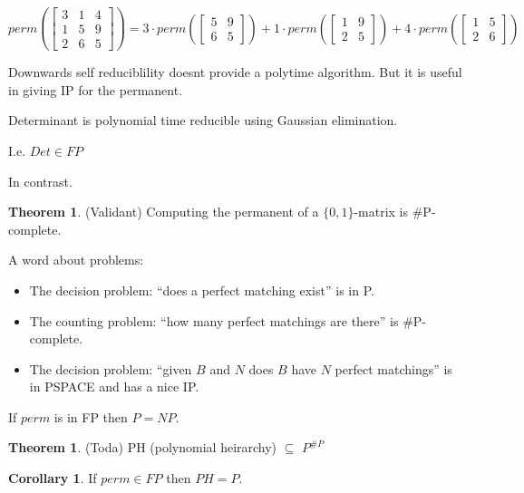 \documentclass[a4paper,12pt]{article}
\theoremstyle{definition}
\newtheorem{theorem}[counter]{Theorem}
\newtheorem{corollary}[counter]{Corollary}
\theoremstyle{remark}
\begin{document}
\begin{equation*}
    perm(\begin{bmatrix}
        3 & 1 & 4 \\
        1 & 5 & 9 \\
        2 & 6 & 5
    \end{bmatrix})
    =
    3 \cdot perm(\begin{bmatrix}
        5 & 9 \\
        6 & 5
    \end{bmatrix}) 
    + 1 \cdot perm(\begin{bmatrix}
        1 & 9 \\
        2 & 5
    \end{bmatrix})
    + 4 \cdot perm(\begin{bmatrix}
        1 & 5 \\
        2 & 6
    \end{bmatrix})
\end{equation*}

Downwards self reduciblility doesnt provide a polytime algorithm. But it is useful in giving IP for the permanent.

Determinant is polynomial time reducible using Gaussian elimination.

I.e. $Det \in FP$

In contrast.

\begin{theorem}(Validant)
    Computing the permanent of a $\{0, 1\}$-matrix is $\#$P-complete.
\end{theorem}

A word about problems:
\begin{itemize}
    \item The decision problem: ``does a perfect matching exist'' is in P.
    \item The counting problem: ``how many perfect matchings are there'' is $\#$P-complete.
    \item The decision problem: ``given $B$ and $N$ does $B$ have $N$ perfect matchings'' is in PSPACE and has a nice IP.
\end{itemize}

If $perm$ is in FP then $P = NP$.

\begin{theorem}
    (Toda)
    PH (polynomial heirarchy) $\subseteq$ $P^{\#P}$
\end{theorem}

\begin{corollary}
    If $perm \in FP$ then $PH = P$.
\end{corollary}
\end{document}
